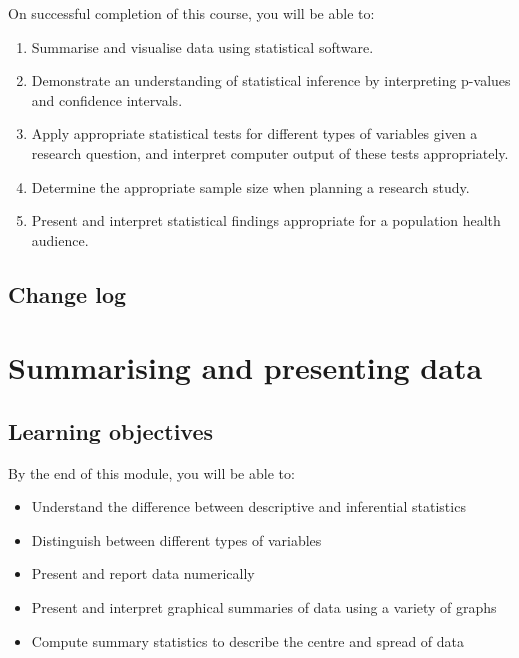 \documentclass[
  a4paper,
]{memoir}
\providecommand{\tightlist}{%
  \setlength{\itemsep}{0pt}\setlength{\parskip}{0pt}}\usepackage{longtable,booktabs,array}
\begin{document}

On successful completion of this course, you will be able to:

\begin{enumerate}
\def\labelenumi{\arabic{enumi}.}
\tightlist
\item
  Summarise and visualise data using statistical software.
\item
  Demonstrate an understanding of statistical inference by interpreting
  p-values and confidence intervals.
\item
  Apply appropriate statistical tests for different types of variables
  given a research question, and interpret computer output of these
  tests appropriately.
\item
  Determine the appropriate sample size when planning a research study.
\item
  Present and interpret statistical findings appropriate for a
  population health audience.
\end{enumerate}

\hypertarget{change-log}{%
\section*{Change log}\label{change-log}}



\hypertarget{summarising-and-presenting-data}{%
\chapter{Summarising and presenting
data}\label{summarising-and-presenting-data}}

\hypertarget{learning-objectives}{%
\section*{Learning objectives}\label{learning-objectives}}


By the end of this module, you will be able to:

\begin{itemize}
\tightlist
\item
  Understand the difference between descriptive and inferential
  statistics
\item
  Distinguish between different types of variables
\item
  Present and report data numerically
\item
  Present and interpret graphical summaries of data using a variety of
  graphs
\item
  Compute summary statistics to describe the centre and spread of data
\end{itemize}
\end{document}
